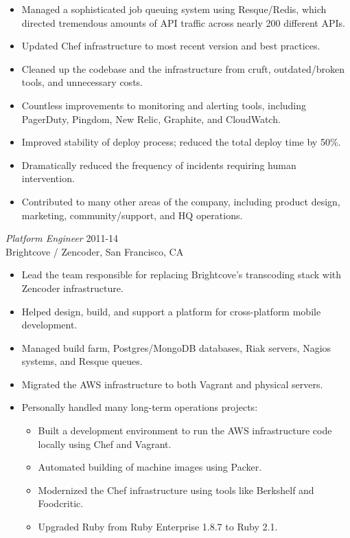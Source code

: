 \documentclass[line,margin]{res}
\begin{document}
\begin{resume}
\begin{itemize}
    \item Managed a sophisticated job queuing system using Resque/Redis, which directed tremendous amounts of API traffic across nearly 200 different APIs.
    \item Updated Chef infrastructure to most recent version and best practices.
    \item Cleaned up the codebase and the infrastructure from cruft, outdated/broken tools, and unnecessary costs.
    \item Countless improvements to monitoring and alerting tools, including PagerDuty, Pingdom, New Relic, Graphite, and CloudWatch.
    \item Improved stability of deploy process; reduced the total deploy time by 50\%.
    \item Dramatically reduced the frequency of incidents requiring human intervention.
    \item Contributed to many other areas of the company, including product design, marketing, community/support, and HQ operations.
  \end{itemize}

  {\sl Platform Engineer}  \hfill 2011-14 \\
  Brightcove / Zencoder,
  San Francisco, CA
  \begin{itemize}  \itemsep -2pt %
    \item Lead the team responsible for replacing Brightcove's transcoding stack with Zencoder infrastructure.
    \item Helped design, build, and support a platform for cross-platform mobile development.
    \item Managed build farm, Postgres/MongoDB databases, Riak servers, Nagios systems, and Resque queues.
    \item Migrated the AWS infrastructure to both Vagrant and physical servers.
    \item Personally handled many long-term operations projects:

    \vspace{-2.5mm} %
    \begin{itemize}  \itemsep -3pt %
      \item Built a development environment to run the AWS infrastructure code locally using Chef and Vagrant.
      \item Automated building of machine images using Packer.
      \item Modernized the Chef infrastructure using tools like Berkshelf and Foodcritic.
      \item Upgraded Ruby from Ruby Enterprise 1.8.7 to Ruby 2.1.
    \end{itemize}
  \end{itemize}


\end{resume}
\end{document}
